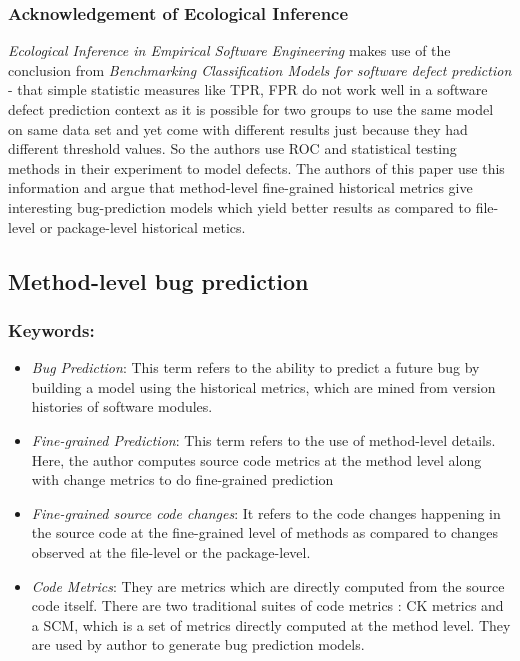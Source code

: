 \documentclass{sig-alternate-05-2015}
\begin{document}
\subsubsection{Acknowledgement of Ecological Inference}
\emph{Ecological Inference in Empirical Software Engineering} makes use of the conclusion from \emph{Benchmarking Classification Models for software defect prediction} - that simple statistic measures like TPR, FPR do not work well in a software defect prediction context as it is possible for two groups to use the same model on same data set and yet come with different results just because they had different threshold values. So the authors use ROC and statistical testing methods in their experiment to model defects. The authors of this paper use this information and argue that method-level fine-grained historical metrics give interesting bug-prediction models which yield better results as compared to file-level or package-level historical metics.

\subsection{Method-level bug prediction \cite{Giger:2012}}

\subsubsection{Keywords:}
\begin{itemize}
\item \emph{Bug Prediction}: This term refers to the ability to predict a future bug by building a model using the historical metrics, which are mined from version histories of software modules.
\item \emph{Fine-grained Prediction}: This term refers to the use of method-level details. Here, the author computes source code metrics at the method level along with change metrics to do fine-grained prediction
\item \emph{Fine-grained source code changes}: It refers to the code changes happening in the source code at the fine-grained level of methods as compared to changes observed at the file-level or the package-level.
\item \emph{Code Metrics}: They are metrics which are directly computed from the source code itself. There are two traditional suites of code metrics : CK metrics and a SCM, which is a set of metrics directly computed at the method level. They are used by author to generate bug prediction models.
\end{itemize} 
\end{document}
